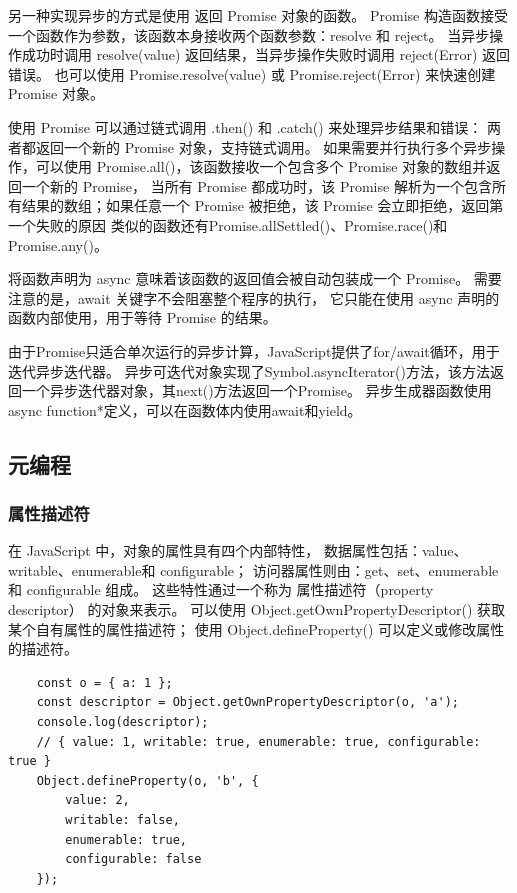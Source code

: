 另一种实现异步的方式是使用 返回 Promise 对象的函数。
Promise 构造函数接受一个函数作为参数，该函数本身接收两个函数参数：resolve 和 reject。
当异步操作成功时调用 resolve(value) 返回结果，当异步操作失败时调用 reject(Error) 返回错误。
也可以使用 Promise.resolve(value) 或 Promise.reject(Error) 来快速创建 Promise 对象。

使用 Promise 可以通过链式调用 .then() 和 .catch() 来处理异步结果和错误：
两者都返回一个新的 Promise 对象，支持链式调用。
如果需要并行执行多个异步操作，可以使用 Promise.all()，该函数接收一个包含多个 Promise 对象的数组并返回一个新的 Promise，
当所有 Promise 都成功时，该 Promise 解析为一个包含所有结果的数组；如果任意一个 Promise 被拒绝，该 Promise 会立即拒绝，返回第一个失败的原因
类似的函数还有Promise.allSettled()、Promise.race()和Promise.any()。

将函数声明为 async 意味着该函数的返回值会被自动包装成一个 Promise。
需要注意的是，await 关键字不会阻塞整个程序的执行，
它只能在使用 async 声明的函数内部使用，用于等待 Promise 的结果。

由于Promise只适合单次运行的异步计算，JavaScript提供了for/await循环，用于迭代异步迭代器。
异步可迭代对象实现了Symbol.asyncIterator()方法，该方法返回一个异步迭代器对象，其next()方法返回一个Promise。
异步生成器函数使用async function*定义，可以在函数体内使用await和yield。

\subsection{元编程}
\subsubsection{属性描述符}
在 JavaScript 中，对象的属性具有四个内部特性，
数据属性包括：value、writable、enumerable和 configurable；
访问器属性则由：get、set、enumerable 和 configurable 组成。
这些特性通过一个称为 属性描述符（property descriptor） 的对象来表示。
可以使用 Object.getOwnPropertyDescriptor() 获取某个自有属性的属性描述符；
使用 Object.defineProperty() 可以定义或修改属性的描述符。
\begin{verbatim}
    const o = { a: 1 };
    const descriptor = Object.getOwnPropertyDescriptor(o, 'a');
    console.log(descriptor);
    // { value: 1, writable: true, enumerable: true, configurable: true }
    Object.defineProperty(o, 'b', {
        value: 2,
        writable: false,
        enumerable: true,
        configurable: false
    });
\end{verbatim}


